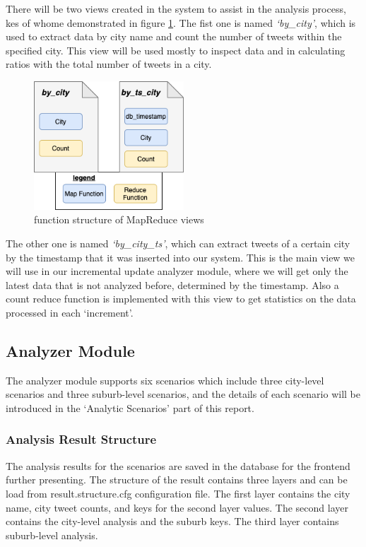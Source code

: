 \documentclass{article}
\begin{document}
There will be two views created in the system to assist in the analysis process, kes of whome demonstrated in figure \ref{fig:mapreduce}. The fist one is named \textit{‘by\_city’}, which is used to extract data by city name and count the number of tweets within the specified city. This view will be used mostly to inspect data and in calculating ratios with the total number of tweets in a city.
\begin{figure}
\centering
\includegraphics[width=0.5\textwidth]{img/mapreduce.png}
\caption{function structure of MapReduce views}
\label{fig:mapreduce}
\end{figure}

The other one is named \textit{‘by\_city\_ts’}, which can extract tweets of a certain city by the timestamp that it was inserted into our system. This is the main view we will use in our incremental update analyzer module, where we will get only the latest data that is not analyzed before, determined by the timestamp. Also a count reduce function is implemented with this view to get statistics on the data processed in each ‘increment’.

\subsection{Analyzer Module}
The analyzer module supports six scenarios which include three city-level scenarios and three suburb-level scenarios, and the details of each scenario will be introduced in the ‘Analytic Scenarios’ part of this report.
\subsubsection{Analysis Result Structure}
The analysis results for the scenarios are saved in the database for the frontend further presenting. The structure of the result contains three layers and can be load from result.structure.cfg configuration file. The first layer contains the city name, city tweet counts, and keys for the second layer values. The second layer contains the city-level analysis and the suburb keys. The third layer contains suburb-level analysis.
\end{document}
